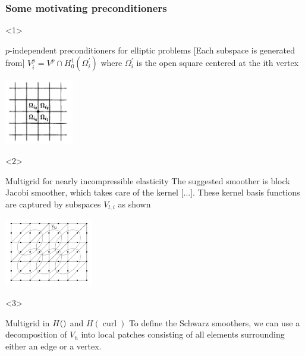 \documentclass[presentation,aspectratio=43,10pt]{beamer}
\let\div\relax
\DeclareMathOperator{\div}{div}
\DeclareMathOperator{\curl}{curl}
\begin{document}
\begin{frame}
  \frametitle{Some motivating preconditioners}

  \begin{onlyenv}<1>
    \begin{block}{$p$-independent preconditioners for elliptic problems}
      [Each subspace is generated from]
      $V_i^p = V^p \cap H^1_0(\Omega_i^{'})$ where $\Omega_i^{'}$ is the open square
      centered at the ith vertex
      \begin{center}
        \includegraphics[width=3cm]{pavarino}
      \end{center}
      \begin{flushright}
        \textcite{Pavarino:1993} \hspace{4em}
      \end{flushright}
    \end{block}
  \end{onlyenv}

  \begin{onlyenv}<2>
    \begin{block}{Multigrid for nearly incompressible elasticity}
      The suggested smoother is block Jacobi smoother, which takes
      care of the kernel [...]. These kernel basis functions are
      captured by subspaces $V_{l,i}$ as shown
      \begin{center}
        \includegraphics[height=3cm]{schoeberl}
      \end{center}
      \begin{flushright}
        \textcite{Schoeberl:1999} \hspace{4em}
      \end{flushright}
    \end{block}
  \end{onlyenv}

  \begin{onlyenv}<3>
    \begin{block}{Multigrid in $H(\div)$ and $H(\curl)$}
      To define the Schwarz smoothers, we can use a decomposition of
      $V_h$ into local patches consisting of all elements surrounding
      either an edge or a vertex.


\end{block}
\end{onlyenv}
\end{frame}
\end{document}
